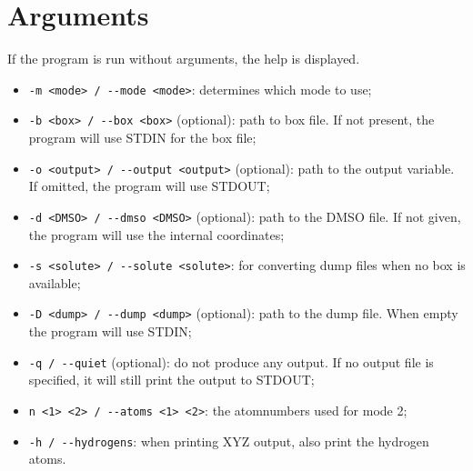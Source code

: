 \section{Arguments}
If the program is run without arguments, the help is displayed.

\begin{itemize}
	\item \verb|-m <mode> / --mode <mode>|: determines which mode to use;
	\item \verb|-b <box> / --box <box>| (optional): path to box file. If not 
	present, the 
	program will use STDIN for the box file;
	\item \verb|-o <output> / --output <output>| (optional): path to the output 
	variable. If 
	omitted, the program will use STDOUT;
	\item \verb|-d <DMSO> / --dmso <DMSO>| (optional): path to the DMSO file. 
	If not given, the 
	program will use the internal coordinates;
	\item \verb|-s <solute> / --solute <solute>|: for converting dump files 
	when no box is 
	available;
	\item \verb|-D <dump> / --dump <dump>| (optional): path to the dump file. 
	When empty the 
	program will use STDIN;
	\item \verb|-q / --quiet| (optional): do not produce any output. If no 
	output file is 
	specified, it will still print the output to STDOUT;
	\item \verb|n <1> <2> / --atoms <1> <2>|: the atomnumbers used for mode 2;
	\item \verb|-h / --hydrogens|: when printing XYZ output, also print the 
	hydrogen atoms.
\end{itemize}